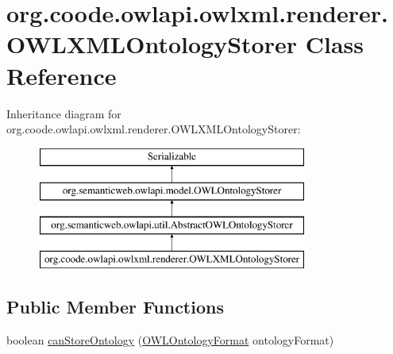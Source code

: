 \hypertarget{classorg_1_1coode_1_1owlapi_1_1owlxml_1_1renderer_1_1_o_w_l_x_m_l_ontology_storer}{\section{org.\-coode.\-owlapi.\-owlxml.\-renderer.\-O\-W\-L\-X\-M\-L\-Ontology\-Storer Class Reference}
\label{classorg_1_1coode_1_1owlapi_1_1owlxml_1_1renderer_1_1_o_w_l_x_m_l_ontology_storer}
}
Inheritance diagram for org.\-coode.\-owlapi.\-owlxml.\-renderer.\-O\-W\-L\-X\-M\-L\-Ontology\-Storer\-:\begin{figure}[H]
\begin{center}
\leavevmode
\includegraphics[height=4.000000cm]{classorg_1_1coode_1_1owlapi_1_1owlxml_1_1renderer_1_1_o_w_l_x_m_l_ontology_storer}
\end{center}
\end{figure}
\subsection*{Public Member Functions}
\begin{DoxyCompactItemize}
\item 
boolean \hyperlink{classorg_1_1coode_1_1owlapi_1_1owlxml_1_1renderer_1_1_o_w_l_x_m_l_ontology_storer_ab254fc354d278a8bdf7108e2844edbb2}{can\-Store\-Ontology} (\hyperlink{classorg_1_1semanticweb_1_1owlapi_1_1model_1_1_o_w_l_ontology_format}{O\-W\-L\-Ontology\-Format} ontology\-Format)
\end{DoxyCompactItemize}
